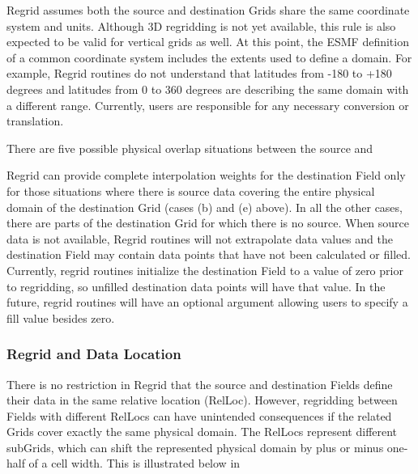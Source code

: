 Regrid assumes both the source and destination Grids share the same coordinate
system and units.  Although 3D regridding is not yet available, this rule is
also expected to be valid for vertical grids as well.  At this point, the ESMF
definition of a common coordinate system includes the extents used to define
a domain.  For example, Regrid routines do not understand that latitudes from
-180 to +180 degrees and latitudes from 0 to 360 degrees are describing the
same domain with a different range.  Currently, users are responsible for any
necessary conversion or translation.  

There are five possible physical overlap situations between the source and


Regrid can provide complete interpolation weights for the destination Field
only for those situations where there is source data covering the entire physical
domain of the destination Grid (cases (b) and (e) above).  In all the other
cases, there are parts of the destination Grid for which there is no source. 
When source data is not available, Regrid routines will not extrapolate data
values and the destination Field may contain data points that have not been
calculated or filled.  Currently, regrid routines initialize the destination
Field to a value of zero prior to regridding, so unfilled destination data points
will have that value.  In the future, regrid routines will have an optional
argument allowing users to specify a fill value besides zero.  


\subsubsection{Regrid and Data Location}

There is no restriction in Regrid that the source and destination Fields
define their data in the same relative location (RelLoc).  However, regridding
between Fields with different RelLocs can have unintended consequences if the
related Grids cover exactly the same physical domain.  The RelLocs represent
different subGrids, which can shift the represented physical domain by plus or
minus one-half of a cell width.  This is illustrated below in

